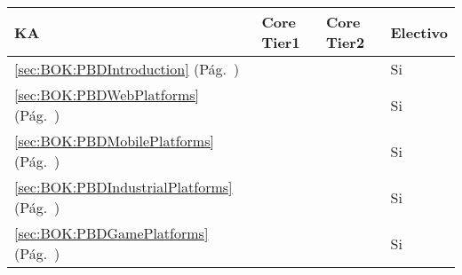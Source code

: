 \begin{center}
\begin{tabularx}{\textwidth}{|X|p{1cm}|p{1cm}|p{1.4cm}|}\hline
\textbf{\acf{KA}} & \textbf{Core Tier1} & \textbf{Core Tier2} & \textbf{Electivo} \\ \hline
\ref{sec:BOK:PBDIntroduction} \htmlref{\PBDIntroduction}{sec:BOK:PBDIntroduction}\xspace (Pág.~\pageref{sec:BOK:PBDIntroduction}) & ~ & ~ & Si \\ \hline
\ref{sec:BOK:PBDWebPlatforms} \htmlref{\PBDWebPlatforms}{sec:BOK:PBDWebPlatforms}\xspace (Pág.~\pageref{sec:BOK:PBDWebPlatforms}) & ~ & ~ & Si \\ \hline
\ref{sec:BOK:PBDMobilePlatforms} \htmlref{\PBDMobilePlatforms}{sec:BOK:PBDMobilePlatforms}\xspace (Pág.~\pageref{sec:BOK:PBDMobilePlatforms}) & ~ & ~ & Si \\ \hline
\ref{sec:BOK:PBDIndustrialPlatforms} \htmlref{\PBDIndustrialPlatforms}{sec:BOK:PBDIndustrialPlatforms}\xspace (Pág.~\pageref{sec:BOK:PBDIndustrialPlatforms}) & ~ & ~ & Si \\ \hline
\ref{sec:BOK:PBDGamePlatforms} \htmlref{\PBDGamePlatforms}{sec:BOK:PBDGamePlatforms}\xspace (Pág.~\pageref{sec:BOK:PBDGamePlatforms}) & ~ & ~ & Si \\ \hline
\end{tabularx}
\end{center}
